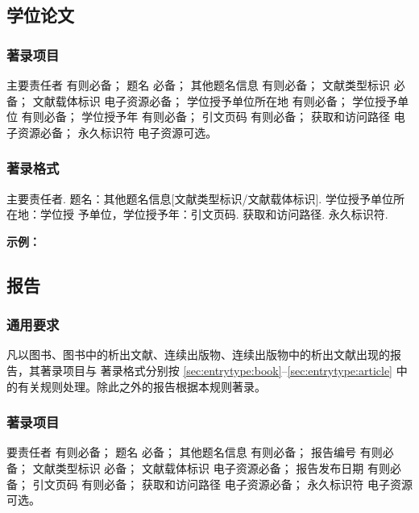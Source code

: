 \documentclass[twoside]{article}%
\begin{document}
\subsection{学位论文}\label{sec:entrytype:thesis}

\subsubsection{著录项目}

主要责任者 有则必备；
题名 必备；
其他题名信息 有则必备；
文献类型标识 必备；
文献载体标识 电子资源必备；
学位授予单位所在地 有则必备；
学位授予单位 有则必备；
学位授予年 有则必备；
引文页码 有则必备；
获取和访问路径 电子资源必备；
永久标识符 电子资源可选。

\subsubsection{著录格式}

主要责任者. 题名：其他题名信息[文献类型标识/文献载体标识]. 学位授予单位所在地：学位授
予单位，学位授予年：引文页码. 获取和访问路径. 永久标识符.

\begin{refsection}

\nocite{王琦2022,CALMS1965--,何筱梅2016,CHRISTOU2024,曲恩熙2023社交}


\textbf{示例：}

{\printbibliography[heading=none,env=indentegenv]}
\end{refsection}


\subsection{报告}\label{sec:entrytype:report}

\subsubsection{通用要求}

凡以图书、图书中的析出文献、连续出版物、连续出版物中的析出文献出现的报告，其著录项目与
著录格式分别按 \ref{sec:entrytype:book}--\ref{sec:entrytype:article} 中的有关规则处理。除此之外的报告根据本规则著录。

\subsubsection{著录项目}

要责任者 有则必备；
题名 必备；
其他题名信息 有则必备；
报告编号 有则必备；
文献类型标识 必备；
文献载体标识 电子资源必备；
报告发布日期 有则必备；
引文页码 有则必备；
获取和访问路径 电子资源必备；
永久标识符 电子资源可选。
\end{document}
